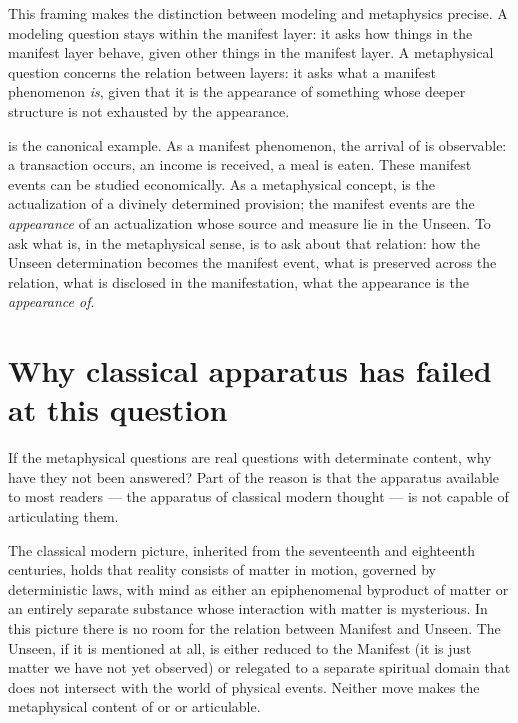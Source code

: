 This framing makes the distinction between modeling and metaphysics
precise. A modeling question stays within the manifest layer: it asks
how things in the manifest layer behave, given other things in the
manifest layer. A metaphysical question concerns the relation between
layers: it asks what a manifest phenomenon \emph{is}, given that it is
the appearance of something whose deeper structure is not exhausted by
the appearance.

 is the canonical example. As a manifest phenomenon, the
arrival of  is observable: a transaction occurs, an income is
received, a meal is eaten. These manifest events can be studied
economically. As a metaphysical concept,  is the actualization
of a divinely determined provision; the manifest events are the
\emph{appearance} of an actualization whose source and measure lie in
the Unseen. To ask what  is, in the metaphysical sense, is to
ask about that relation: how the Unseen determination becomes the
manifest event, what is preserved across the relation, what is
disclosed in the manifestation, what the appearance is the
\emph{appearance of}.

\section{Why classical apparatus has failed at this question}
\label{sec:classical-failure}

If the metaphysical questions are real questions with determinate
content, why have they not been answered? Part of the reason is that
the apparatus available to most readers --- the apparatus of classical
modern thought --- is not capable of articulating them.

The classical modern picture, inherited from the seventeenth and
eighteenth centuries, holds that reality consists of matter in motion,
governed by deterministic laws, with mind as either an epiphenomenal
byproduct of matter or an entirely separate substance whose interaction
with matter is mysterious. In this picture there is no room for the
relation between Manifest and Unseen. The Unseen, if it is mentioned at
all, is either reduced to the Manifest (it is just matter we have not
yet observed) or relegated to a separate spiritual domain that does not
intersect with the world of physical events. Neither move makes the
metaphysical content of  or  or 
articulable.

